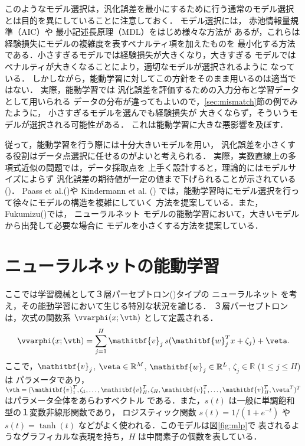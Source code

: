 \documentclass[master]{cimt}
\newcommand{\vv}{\mathitbf{v}}
\newcommand{\vw}{\mathitbf{w}}
\newcommand{\R}{{\mathbb{R}}}
\begin{document}
このようなモデル選択は，汎化誤差を最小にするために行う通常のモデル選択
とは目的を異にしていることに注意しておく．
モデル選択には，
赤池情報量規準（AIC）や
最小記述長原理（MDL）をはじめ様々な方法が
あるが，これらは経験損失にモデルの複雑度を表すペナルティ項を加えたものを
最小化する方法である．小さすぎるモデルでは経験損失が大きくなり，大きすぎる
モデルではペナルティが大きくなることにより，適切なモデルが選択されるように
なっている．
しかしながら，能動学習に対してこの方針をそのまま用いるのは適当ではない．
実際，能動学習では
汎化誤差を評価するための入力分布と学習データとして用いられる
データの分布が違ってもよいので，\ref{sec:mismatch}節の例でみたように，
小さすぎるモデルを選んでも経験損失が
大きくならず，そういうモデルが選択される可能性がある．
これは能動学習に大きな悪影響を及ぼす．

従って，能動学習を行う際には十分大きいモデルを用い，
汎化誤差を小さくする役割はデータ点選択に任せるのがよいと考えられる．
実際，実数直線上の多項式近似の問題では，データ採取点を
上手く設計すると，理論的にはモデルサイズによらず
汎化誤差の期待値が一定の値まで下げられることが示されている
(\cite{fuku_poly})．
Paass et al.(\cite{Paass_nips94})や Kindermann et al. (\cite{Paass_95})
では，能動学習時にモデル選択を行って徐々にモデルの構造を複雑にしていく
方法を提案している．また，Fukumizu(\cite{fuku_al_ieee})では，
ニューラルネット
モデルの能動学習において，大きいモデルから出発して必要な場合に
モデルを小さくする方法を提案している．





\section{ニューラルネットの能動学習}

\label{sec:nn_al}
ここでは学習機械として３層パーセプトロン(\cite{pdp})タイプの
ニューラルネット
を考え，その能動学習において生じる特別な状況を論じる．
３層パーセプトロンは，次式の関数系 $\vvarphi(x; \vth)$ として定義される．
\begin{equation*}
	\vvarphi(x; \vth) = \sum_{j=1}^H \vv_j\, s(\vw_j^T x + \zeta_j) + 
	\veta.
\end{equation*}
ここで，$\vv_j$, $\veta\in\R^M$, $\vw_j\in\R^L$, $\zeta_j\in\R$ 
($1\leq j \leq H$) は
パラメータであり，$\vth = (\vv_1^T,\zeta_1,\ldots, \vv_H^T, \zeta_H,
\vv_1^T, \ldots, \vv_H^T, \veta^T)^T$ はパラメータ全体をあらわすベクトル
である．また，$s(t)$ は一般に単調飽和型の１変数非線形関数であり，
ロジスティック関数 $
	s(t) = 1/(1+e^{-t})
$
や $s(t) = \tanh(t)$ などがよく使われる．このモデルは図\ref{fig:mlp}で
表されるようなグラフィカルな表現を持ち，$H$ は中間素子の個数を表している．
\end{document}
